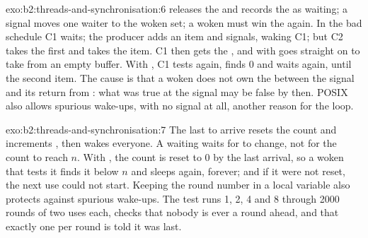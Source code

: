 \begin{solution}{exo:b2:threads-and-synchronisation:6}
 releases the  and records the  as waiting; a signal moves one waiter to the woken set; a woken
 must win the  again. In the bad schedule C1 waits; the producer adds an item and signals, waking C1; but C2
takes the  first and takes the item. C1 then gets the , and with  goes straight on to take from an
empty buffer. With , C1 tests again, finds 0 and waits again, until the second item. The cause is that a
woken  does not own the  between the signal and its return from : what was true at the signal
may be false by then. POSIX also allows spurious wake-ups, with no signal at all, another reason for the loop.
\end{solution}

\begin{solution}{exo:b2:threads-and-synchronisation:7}
The last  to arrive resets the count and increments , then wakes everyone. A waiting  waits
for  to change, not for the count to reach $n$. With , the count is reset to 0 by
the last arrival, so a woken  that tests it finds it below $n$ and sleeps again, forever; and if it were not
reset, the next use could not start. Keeping the round number in a local variable also protects against spurious
wake-ups. The test runs 1, 2, 4 and 8  through 2000 rounds of two uses each, checks that nobody is ever a round
ahead, and that exactly one  per round is told it was last.
\end{solution}


